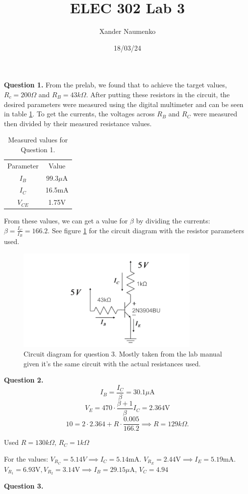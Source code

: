 \documentclass[letterpaper, reqno,11pt]{article}
\begin{document}
\title{ELEC 302 Lab 3}
\date{18/03/24}
\author{Xander Naumenko}
\maketitle

{\medskip\noindent\bf Question 1.} From the prelab, we found that to achieve the target values, $R_c=200\Omega$ and $R_B=43k\Omega$. After putting these resistors in the circuit, the desired parameters were measured using the digital multimeter and can be seen in table \ref{tab:q1}. To get the currents, the voltages across $R_B$ and $R_C$ were measured then divided by their measured resistance values.

\begin{table}[htpb]
    \centering
    \caption{Measured values for Question 1.}
    \label{tab:q1}
    \begin{tabular}{|c|c|}
    \hline
    Parameter & Value \\
    $I_B$ & $99.3\mu $A \\
    $I_C$ & 16.5mA \\
    $V_{CE}$ & 1.75V \\
    \hline
    \end{tabular}
\end{table}

From these values, we can get a value for $\beta$ by dividing the currents: $\beta = \frac{I_C}{I_B}=166.2$. See figure \ref{fig:q1} for the circuit diagram with the resistor parameters used.

\begin{figure}[htpb]
    \centering
    \includegraphics[width=0.8\textwidth]{q1}
    \caption{Circuit diagram for question 3. Mostly taken from the lab manual given it's the same circuit with the actual resistances used.}
    \label{fig:q1}
\end{figure}

{\medskip\noindent\bf Question 2.} 
\[
I_B=\frac{I_C}{\beta}=30.1\mu\text{A}
\]
\[
V_E=470\cdot \frac{\beta+1}{\beta} I_C=2.364\text{V}
\]
\[
10=2\cdot 2.364+R\cdot \frac{0.005}{166.2}\implies R=129k\Omega
.\]

Used $R=130k\Omega$, $R_C=1k\Omega$

For the values: $V_{R_C}=5.14V\implies I_C=5.14$mA. $V_{R_E}=2.44\text{V}\implies I_E=5.19$mA. $V_{R_1}=6.93\text{V}, V_{R_2}=3.14\text{V}\implies I_B=29.15\mu$A, $V_C=4.94$

{\medskip\noindent\bf Question 3.} 
\end{document}
